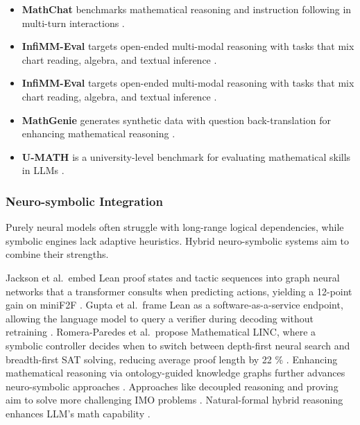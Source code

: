 \documentclass[acmsmall,anonymous]{acmart}
\begin{document}
\begin{itemize}
    \item \textbf{MathChat} benchmarks mathematical reasoning and instruction following in multi-turn interactions \cite{liang2024c}.
    \item \textbf{InfiMM-Eval} targets open-ended multi-modal reasoning with tasks that mix chart reading, algebra, and textual inference \cite{han2023infimmevalcomplexopenendedreasoning}.
    \item \textbf{InfiMM-Eval} targets open-ended multi-modal reasoning with tasks that mix chart reading, algebra, and textual inference \cite{han2023infimmevalcomplexopenendedreasoning}.
    \item \textbf{MathGenie} generates synthetic data with question back-translation for enhancing mathematical reasoning \cite{lu2024b}.
    \item \textbf{U-MATH} is a university-level benchmark for evaluating mathematical skills in LLMs \cite{chernyshev2024}.
\end{itemize}

\subsubsection{Neuro-symbolic Integration}\label{sec:neurosym}
Purely neural models often struggle with long-range logical dependencies, while symbolic engines lack adaptive heuristics. Hybrid neuro-symbolic systems aim to combine their strengths.

Jackson et al.\ embed Lean proof states and tactic sequences into graph neural networks that a transformer consults when predicting actions, yielding a 12-point gain on miniF2F \cite{jackson2024neurosymbolic}.  Gupta et al.\ frame Lean as a software-as-a-service endpoint, allowing the language model to query a verifier during decoding without retraining \cite{gupta2024saas}.  Romera-Paredes et al.\ propose Mathematical LINC, where a symbolic controller decides when to switch between depth-first neural search and breadth-first SAT solving, reducing average proof length by 22 \% \cite{romera2024mathematical}. Enhancing mathematical reasoning via ontology-guided knowledge graphs further advances neuro-symbolic approaches \cite{chen2024enhancingmathematicalreasoningllms}. Approaches like decoupled reasoning and proving aim to solve more challenging IMO problems \cite{liang2025imo}. Natural-formal hybrid reasoning enhances LLM's math capability \cite{wang2025letsreasonformally}.
\end{document}
